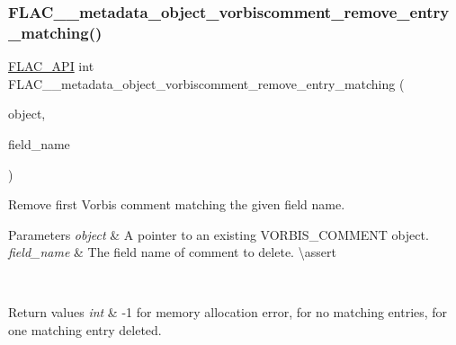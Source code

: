 \subsubsection{\texorpdfstring{FLAC\_\_metadata\_object\_vorbiscomment\_remove\_entry\_matching()}{FLAC\_\_metadata\_object\_vorbiscomment\_remove\_entry\_matching()}}
{\footnotesize\ttfamily \mbox{\hyperlink{group__flac__export_ga56ca07df8a23310707732b1c0007d6f5}{F\+L\+A\+C\+\_\+\+A\+PI}} int F\+L\+A\+C\+\_\+\+\_\+metadata\+\_\+object\+\_\+vorbiscomment\+\_\+remove\+\_\+entry\+\_\+matching (\begin{DoxyParamCaption}\item[{\mbox{\hyperlink{struct_f_l_a_c_____stream_metadata}{F\+L\+A\+C\+\_\+\+\_\+\+Stream\+Metadata}} $\ast$}]{object,  }\item[{const char $\ast$}]{field\+\_\+name }\end{DoxyParamCaption})}

Remove first Vorbis comment matching the given field name.


\begin{DoxyParams}{Parameters}
{\em object} & A pointer to an existing V\+O\+R\+B\+I\+S\+\_\+\+C\+O\+M\+M\+E\+NT object. \\
\hline
{\em field\+\_\+name} & The field name of comment to delete. \textbackslash{}assert 
\begin{DoxyCode}{1}
\end{DoxyCode}
 
\begin{DoxyCode}{1}
\end{DoxyCode}
 \\
\hline
\end{DoxyParams}

\begin{DoxyRetVals}{Return values}
{\em int} & {\ttfamily -\/1} for memory allocation error, {} for no matching entries, {} for one matching entry deleted. \\
\hline
\end{DoxyRetVals}
\mbox{\label{group__flac__metadata__object_gabef3625575b7e4c7257617a27220959a}} 
